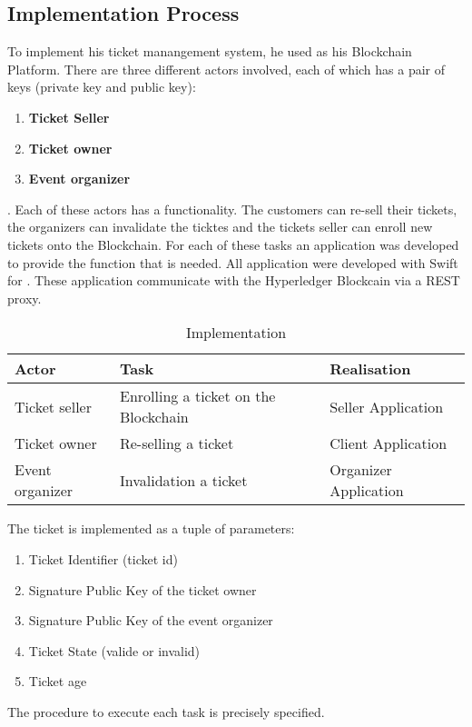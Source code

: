 \subsection*{Implementation Process}
To implement his ticket manangement system, he used  as his Blockchain Platform. There are three different actors involved, each of which has a pair of keys (private key and public key):
\begin{enumerate}[label={\arabic*)},font={\color{red!50!black}\bfseries}]
	\item \textbf{Ticket Seller}
	\item \textbf{Ticket owner} 
	\item \textbf{Event organizer}
\end{enumerate}.  
Each of these actors has a functionality. The customers can re-sell their tickets, the organizers can invalidate the ticktes and the tickets seller can enroll new tickets onto the Blockchain. For each of these tasks an application was developed to provide the function that is needed. All application were developed with Swift for . These application communicate with the Hyperledger Blockcain via a REST proxy. 
\begin{longtable}{ |P{3cm}|P{5cm}|P{4cm}| }
	\caption{Implementation} \label{tab:2017_Tackmann_Implementation} \\
	\hline
 	Actor & Task & Realisation \\ [0.5ex] 
 	\hline\hline
 	\endhead
 	 Ticket seller & Enrolling a ticket on the Blockchain  & Seller Application  \\
	 \hline
	 Ticket owner & Re-selling a ticket  & Client Application  \\
	 \hline
	 Event organizer & Invalidation a ticket & Organizer Application  \\
	 \hline
\end{longtable}
The ticket is implemented as a tuple of parameters:
\begin{enumerate}[label={\arabic*)},font={\color{red!50!black}\bfseries}]
	\item Ticket Identifier (ticket id)
	\item Signature Public Key of the ticket owner 
	\item Signature Public Key of the event organizer
	\item Ticket State (valide or invalid)
	\item Ticket age
\end{enumerate}
The procedure to execute each task is precisely specified.
